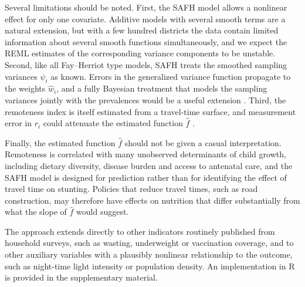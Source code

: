 Several limitations should be noted. First, the SAFH model allows a nonlinear
effect for only one covariate. Additive models with several smooth terms are a
natural extension, but with a few hundred districts the data contain limited
information about several smooth functions simultaneously, and we expect the
REML estimates of the corresponding variance components to be unstable. Second,
like all Fay--Herriot type models, SAFH treats the smoothed sampling variances
$\psi_i$ as known. Errors in the generalized variance function propagate to the
weights $\hat w_i$, and a fully Bayesian treatment that models the sampling
variances jointly with the prevalences would be a useful extension
\citep{you2006small}. Third, the remoteness index is itself estimated from a
travel-time surface, and measurement error in $r_i$ could attenuate the
estimated function $\hat f$ \citep{ybarra2008small}.

Finally, the estimated function $\hat f$ should not be given a casual
interpretation. Remoteness is correlated with many unobserved determinants of
child growth, including dietary diversity, disease burden and access to
antenatal care, and the SAFH model is designed for prediction rather than for
identifying the effect of travel time on stunting. Policies that reduce travel
times, such as road construction, may therefore have effects on nutrition that
differ substantially from what the slope of $\hat f$ would suggest.

The approach extends directly to other indicators routinely published from
household surveys, such as wasting, underweight or vaccination coverage, and to
other auxiliary variables with a plausibly nonlinear relationship to the
outcome, such as night-time light intensity or population density. An
implementation in R is provided in the supplementary material.
